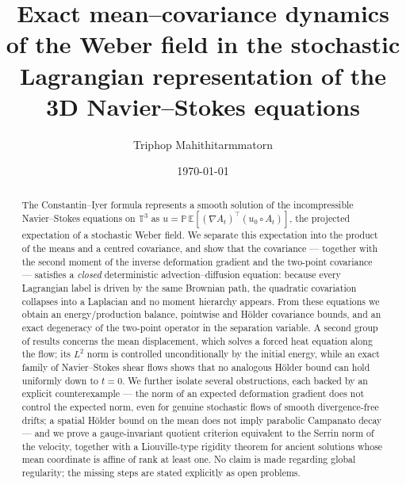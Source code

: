 \documentclass[11pt,reqno]{amsart}
\newcommand{\T}{\mathbb{T}}
\newcommand{\E}{\mathbb{E}}
\newcommand{\Leray}{\mathbb{P}}
\theoremstyle{definition}
\begin{document}
\title[Mean--covariance dynamics of the stochastic Weber field]{Exact mean--covariance dynamics of the Weber field in the stochastic Lagrangian representation of the 3D Navier--Stokes equations}

\author{Triphop Mahithitarmmatorn}

\date{\today}


\begin{abstract}
The Constantin--Iyer formula represents a smooth solution of the incompressible
Navier--Stokes equations on $\T^3$ as
$u=\Leray\,\E[(\nabla A_t)^\top(u_0\circ A_t)]$, the projected expectation of a stochastic
Weber field. We separate this expectation into the product of the means and a centred
covariance, and show that the covariance --- together with the second moment of the inverse
deformation gradient and the two-point covariance --- satisfies a \emph{closed}
deterministic advection--diffusion equation: because every Lagrangian label is driven by
the same Brownian path, the quadratic covariation collapses into a Laplacian and no moment
hierarchy appears. From these equations we obtain an energy/production balance, pointwise
and H\"older covariance bounds, and an exact degeneracy of the two-point operator in the
separation variable. A second group of results concerns the mean displacement, which
solves a forced heat equation along the flow; its $L^2$ norm is controlled unconditionally
by the initial energy, while an exact family of Navier--Stokes shear flows shows that no
analogous H\"older bound can hold uniformly down to $t=0$. We further isolate several
obstructions, each backed by an explicit counterexample --- the norm of an expected
deformation gradient does not control the expected norm, even for genuine stochastic
flows of smooth divergence-free drifts; a spatial
H\"older bound on the mean does not imply parabolic Campanato decay --- and we prove a
gauge-invariant quotient criterion equivalent to the Serrin norm of the velocity, together
with a Liouville-type rigidity theorem for ancient solutions whose mean coordinate is
affine of rank at least one. No claim is made regarding global regularity; the missing
steps are stated explicitly as open problems.
\end{abstract}

\maketitle
\end{document}
